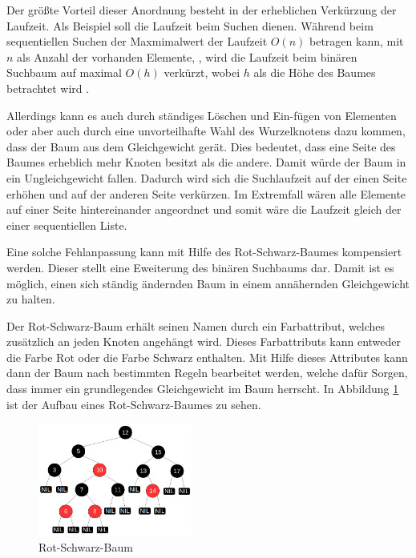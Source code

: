 Der größte Vorteil dieser Anordnung besteht in der erheblichen Verkürzung der Laufzeit. 
Als Beispiel soll die Laufzeit beim Suchen dienen.
Während beim sequentiellen Suchen der Maxmimalwert der Laufzeit $O(n)$ betragen kann, mit $n$ als Anzahl der vorhanden Elemente, , wird die Laufzeit beim binären Suchbaum auf maximal $O(h)$ verkürzt, wobei $h$ als die Höhe des Baumes betrachtet wird \cite{tcormen}.

Allerdings kann es auch durch ständiges Löschen und Ein-fügen von Elementen oder aber auch durch eine unvorteilhafte Wahl des Wurzelknotens dazu kommen, dass der Baum aus dem Gleichgewicht gerät. Dies bedeutet, dass eine Seite des Baumes erheblich mehr Knoten besitzt als die andere. Damit würde der Baum in ein Ungleichgewicht fallen. Dadurch wird sich die Suchlaufzeit auf der einen Seite erhöhen und auf der anderen Seite ver\-kürzen. Im Extremfall wären alle Elemente auf einer Seite hintereinander angeordnet und somit wäre die Laufzeit gleich der einer sequentiellen Liste.

Eine solche Fehlanpassung kann mit Hilfe des Rot-Schwarz-Baumes kompensiert werden. Dieser stellt eine Eweiterung des binären Suchbaums dar. Damit ist es möglich, einen sich ständig ändernden Baum in einem annähernden Gleichgewicht zu halten. 

Der Rot-Schwarz-Baum erhält seinen Namen durch ein Farbattribut, welches zusätzlich an jeden Knoten an\-gehängt wird. Dieses Farbattributs kann entweder die Farbe Rot oder die Farbe Schwarz enthalten. 
Mit Hilfe dieses Attributes kann dann der Baum nach bestimmten Regeln bearbeitet werden, welche dafür Sorgen, dass immer ein grundlegendes Gleichgewicht im Baum herrscht. 
In Abbildung \ref{fig:rbtree} ist der Aufbau eines Rot-Schwarz-Baumes zu sehen.

\begin{figure}[h]
	\centering
	\includegraphics[width=0.45\textwidth]{pictures/redblacktree.png}
	\caption{Rot-Schwarz-Baum}
	\label{fig:rbtree}
\end{figure}


